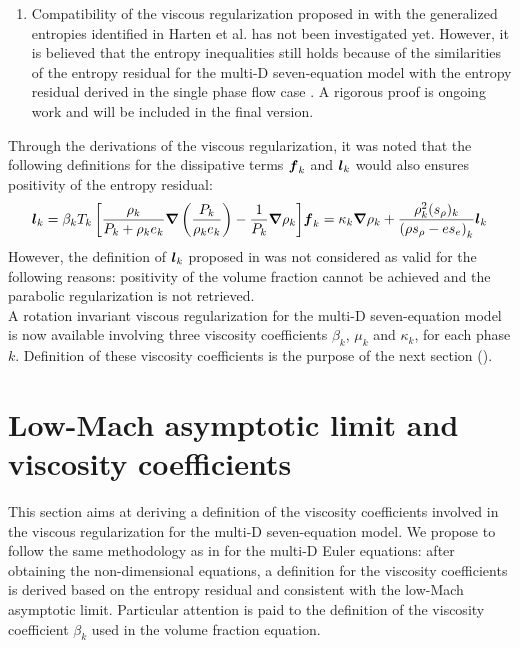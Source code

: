 \begin{enumerate}
\item{Compatibility of the viscous regularization proposed in  with the generalized entropies identified in Harten et al. \cite{Harten} has not been investigated yet. However, it is believed that the entropy inequalities still holds because of the similarities of the entropy residual for the multi-D seven-equation model with the entropy residual derived in the single phase flow case \cite{jlg}. A rigorous proof is ongoing work and will be included in the final version. }
\end{enumerate}
%
Through the derivations of the viscous regularization, it was noted that the following definitions for the dissipative terms $\boldsymbol f_k$ and $\boldsymbol l_k$ would also ensures positivity of the entropy residual:
%
\begin{subequations}
\begin{align}\label{eq:def-l-k-wrong-sect4}
\mbold l_k =\beta_k T_k \left[ \frac{\rho_k}{P_k+\rho_k e_k} \grad \left( \frac{P_k}{\rho_k e_k} \right) - \frac{1}{P_k} \grad \rho_k \right]
\end{align}
\begin{align}
\mbold f_k = \kappa_k \grad \rho_k +  \frac{\rho^2_k (s_{\rho})_k}{\left( \rho s_{\rho} - e s_e \right)_k} \mbold l_k
\end{align}
\end{subequations}
%
However, the definition of $\boldsymbol l_k$ proposed in  was not considered as valid for the following reasons: positivity of the volume fraction cannot be achieved and the parabolic regularization is not retrieved.\\ 

A rotation invariant viscous regularization for the multi-D seven-equation model is now available involving three viscosity coefficients $\beta_k$, $\mu_k$ and $\kappa_k$, for each phase $k$. Definition of these viscosity coefficients is the purpose of the next section ().
\section{Low-Mach asymptotic limit and viscosity coefficients}\label{sec:sev-equ-visc-coeff-sect4}
This section aims at deriving a definition of the viscosity coefficients involved in the viscous regularization for the multi-D seven-equation model. We propose to follow the same methodology as in  for the multi-D Euler equations: after obtaining the non-dimensional equations, a definition for the viscosity coefficients is derived based on the entropy residual and consistent with the low-Mach asymptotic limit. Particular attention is paid to the definition of the viscosity coefficient $\beta_k$ used in the volume fraction equation.

